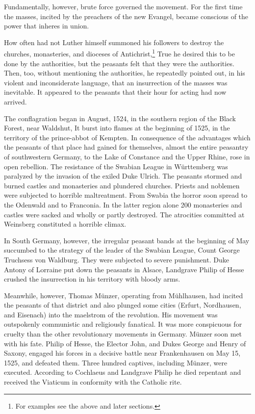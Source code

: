 Fundamentally, however, brute force governed the movement. For
the first time the masses, incited by the preachers of the new Evangel,
became conscious of the power that inheres in union.

How often had not Luther himself summoned his followers to
destroy the churches, monasteries, and dioceses of Antichrist,\footnote
{For examples see the above and later sections.}
True he desired this to be done by the authorities, but the peasants felt
that they were the authorities. Then, too, without mentioning the
authorities, he repeatedly pointed out, in his violent and inconsiderate
language, that an insurrection of the masses was inevitable. It appeared
to the peasants that their hour for acting had now arrived.

The conflagration began in August, 1524, in the southern region
of the Black Forest, near Waldshut, It burst into flames at the beginning
of 1525, in the territory of the prince-abbot of Kempten. In
consequence of the advantages which the peasants of that place had
gained for themselves, almost the entire peasantry of southwestern
Germany, to the Lake of Constance and the Upper Rhine, rose in
open rebellion. The resistance of the Swabian League in Württemberg
was paralyzed by the invasion of the exiled Duke Ulrich. The peasants
stormed and burned castles and monasteries and plundered
churches. Priests and noblemen were subjected to horrible maltreatment.
From Swabia the horror soon spread to the Odenwald and to
Franconia. In the latter region alone 200 monasteries and castles were
sacked and wholly or partly destroyed. The atrocities committed at
Weinsberg constituted a horrible climax.

In South Germany, however, the irregular peasant bands at the
beginning of May succumbed to the strategy of the leader of the
Swabian League, Count George Truchsess von Waldburg. They were
subjected to severe punishment. Duke Antony of Lorraine put down
the peasants in Alsace, Landgrave Philip of Hesse crushed the insurrection
in his territory with bloody arms.

Meanwhile, however, Thomas Münzer, operating from Mühlhausen, had incited
the peasants of that district and also plunged some
cities (Erfurt, Nordhausen, and Eisenach) into the maelstrom of the
revolution. His movement was outspokenly communistic and religiously
fanatical. It was more conspicuous for cruelty than the
other revolutionary movements in Germany. Münzer soon met with
his fate. Philip of Hesse, the Elector John, and Dukes George and
Henry of Saxony, engaged his forces in a decisive battle near Frankenhausen
on May 15, 1525, and defeated them. Three hundred captives,
including Münzer, were executed. According to Cochlaeus and Landgrave
Philip he died repentant and received the Viaticum in conformity
with the Catholic rite.

